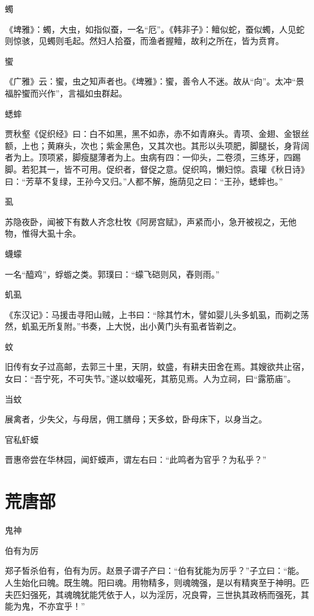 \documentclass[a4paper,12pt,UTF8,twoside]{ctexbook}
\begin{document}
    蠋
    
    《埤雅》：蠋，大虫，如指似蚕，一名“厄”。《韩非子》：鳣似蛇，蚕似蠋，人见蛇则惊骇，见蠋则毛起。然妇人拾蚕，而渔者握鳣，故利之所在，皆为贲育。
    
    蠁
    
    《广雅》云：蠁，虫之知声者也。《埤雅》：蠁，善令人不迷。故从“向”。太冲“景福肸蠁而兴作”，言福如虫群起。
    
    蟋蟀
    
    贾秋壑《促织经》曰：白不如黑，黑不如赤，赤不如青麻头。青项、金翅、金银丝额，上也；黄麻头，次也；紫金黑色，又其次也。其形以头项肥，脚腿长，身背阔者为上。顶项紧，脚瘦腿薄者为上。虫病有四：一仰头，二卷须，三练牙，四踢脚。若犯其一，皆不可用。促织者，督促之意。促织鸣，懒妇惊。袁瓘《秋日诗》曰：“芳草不复绿，王孙今又归。”人都不解，施荫见之曰：“王孙，蟋蟀也。”
    
    虱
    
    苏隐夜卧，闻被下有数人齐念杜牧《阿房宫赋》，声紧而小，急开被视之，无他物，惟得大虱十余。
    
    蠛蠓
    
    一名“醯鸡”，蜉蝣之类。郭璞曰：“蠓飞硙则风，舂则雨。”
    
    虮虱
    
    《东汉记》：马援击寻阳山贼，上书曰：“除其竹木，譬如婴儿头多虮虱，而剃之荡然，虮虱无所复附。”书奏，上大悦，出小黄门头有虱者皆剃之。
    
    蚊
    
    旧传有女子过高邮，去郭三十里，天阴，蚊盛，有耕夫田舍在焉。其嫂欲共止宿，女曰：“吾宁死，不可失节。”遂以蚊嘬死，其筋见焉。人为立祠，曰“露筋庙”。
    
    当蚊
    
    展禽者，少失父，与母居，佣工膳母；天多蚊，卧母床下，以身当之。
    
    官私虾蟆
    
    晋惠帝尝在华林园，闻虾蟆声，谓左右曰：“此鸣者为官乎？为私乎？”
    
    \part{荒唐部}
    
    鬼神
    
    伯有为厉
    
    郑子皙杀伯有，伯有为厉。赵景子谓子产曰：“伯有犹能为厉乎？”子立曰：“能。人生始化曰魄。既生魄。阳曰魂。用物精多，则魂魄强，是以有精爽至于神明。匹夫匹妇强死，其魂魄犹能凭依于人，以为淫厉，况良霄，三世执其政柄而强死，其能为鬼，不亦宜乎！”
    
\end{document}
